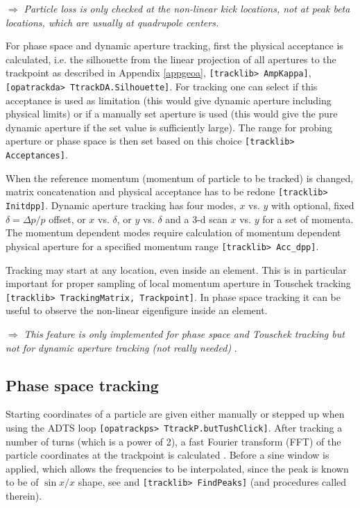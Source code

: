 \documentclass[12pt]{article}
\newcommand\todo[1]{$\Longrightarrow$ {\em #1} }
\newcommand\code[1]{{\tt [#1]}}
\begin{document}
\todo{Particle loss is only checked at the non-linear kick locations, not at peak beta locations, which are usually at quadrupole centers.}

For phase space and dynamic aperture tracking, first the physical acceptance is calculated, i.e. the silhouette from the linear projection of all apertures to the trackpoint as described in Appendix \ref{appgeoa}, \code{tracklib> AmpKappa}, \code{opatrackda> TtrackDA.Silhouette}.
For tracking one can select if this acceptance is used as limitation (this would give dynamic aperture including physical limits) or if a manually set aperture is used (this would give the pure dynamic aperture if the set value is sufficiently large). The range for probing aperture or phase space is then set based on this choice \code{tracklib> Acceptances}.

When the reference momentum (momentum of particle to be tracked) is changed, matrix concatenation and physical acceptance has to be redone \code{tracklib> Initdpp}. Dynamic aperture tracking has four modes, $x$ vs. $y$ with optional, fixed $\delta=\Delta p/p$ offset, or $x$ vs. $\delta$, or $y$ vs. $\delta$ and a 3-d scan $x$ vs. $y$ for a set of momenta. The momentum dependent  modes require calculation of momentum dependent physical aperture for a specified momentum range \code{tracklib> Acc\_dpp}.

Tracking may start at any location, even inside an element. This is in particular important for proper sampling of local momentum aperture in Touschek tracking \code{tracklib> TrackingMatrix, Trackpoint}. In phase space tracking it can be useful to observe the non-linear eigenfigure inside an element.

\todo{This feature is only implemented for phase space and Touschek tracking but not for dynamic aperture tracking (not really needed)}.

\subsection{Phase space tracking}
Starting coordinates of a particle are given either manually or stepped up when using the ADTS loop \code{opatrackps> TtrackP.butTushClick}. After tracking a number of turns (which is a power of 2), a fast Fourier transform (FFT) of the particle coordinates at the trackpoint is calculated \cite{numrec}. Before a sine window is applied, which allows the frequencies to be interpolated, since the peak is known to be of $\sin x/x$ shape, see \cite{jbthesis} and \code{tracklib> FindPeaks} (and procedures called therein).
\end{document}
